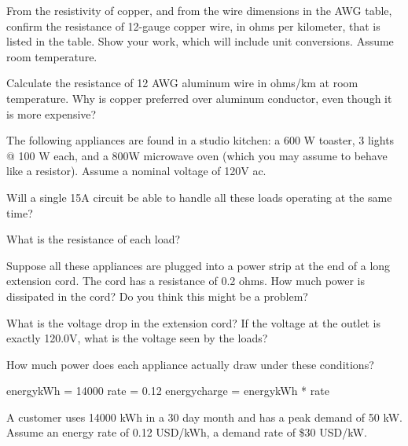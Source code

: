 \documentclass{article}
\begin{document}
\subproblem
From the resistivity of copper, and from the wire dimensions in the AWG
table, confirm the resistance of 12-gauge copper wire, in ohms per kilometer,
that is listed in the table.  Show your work, which will include unit
conversions.  Assume room temperature.


\subproblem
Calculate the resistance of 12 AWG aluminum wire in ohms/km at room
temperature. Why is copper preferred over aluminum conductor, even though it is
more expensive?




The following appliances are found in a studio kitchen: a 600 W toaster, 3
lights @ 100 W each, and a 800W microwave oven (which you may assume to behave
like a resistor). Assume a nominal voltage of 120V ac.

\subproblem
Will a single 15A circuit be able to handle all these loads operating at the
same time?

\subproblem
What is the resistance of each load?

\subproblem
Suppose all these appliances are plugged into a power strip at the end of a
long extension cord. The cord has a resistance of 0.2 ohms. How much power is
dissipated in the cord? Do you think this might be a problem?

\subproblem
What is the voltage drop in the extension cord? If the voltage at the outlet
is exactly 120.0V, what is the voltage seen by the loads?

\subproblem
How much power does each appliance actually draw under these conditions?





\begin{pycode}
energykWh = 14000
rate = 0.12
energycharge = energykWh * rate
\end{pycode}


A customer uses 14000 kWh in a 30 day month and has a peak
demand of 50 kW.  Assume an
energy rate of 0.12 USD/kWh, a demand rate of \$30 USD/kW.
\end{document}
